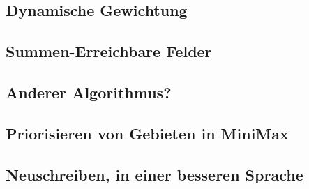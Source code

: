 \documentclass[12pt, draft]{beamer}
\begin{document}
\subsection{Dynamische Gewichtung}
\begin{frame}
\end{frame}
\subsection{Summen-Erreichbare Felder}
\begin{frame}
\end{frame}
\subsection{Anderer Algorithmus?}
\begin{frame}
\end{frame}
\subsection{Priorisieren von Gebieten in MiniMax}
\begin{frame}
\end{frame}
\subsection{Neuschreiben, in einer besseren Sprache}
\begin{frame}
\end{frame}
\end{document}
